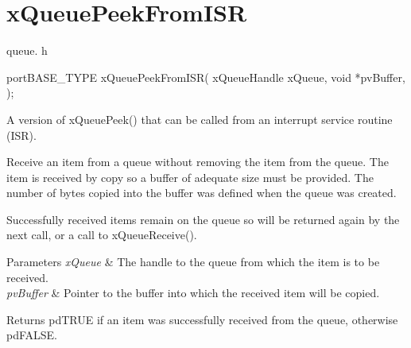 \hypertarget{group__x_queue_peek_from_i_s_r}{\section{x\-Queue\-Peek\-From\-I\-S\-R}
\label{group__x_queue_peek_from_i_s_r}
}
queue. h 
\begin{DoxyPre}
 portBASE\_TYPE xQueuePeekFromISR(
                                                                        xQueueHandle xQueue,
                                                                        void *pvBuffer,
                                                                );\end{DoxyPre}


A version of x\-Queue\-Peek() that can be called from an interrupt service routine (I\-S\-R).

Receive an item from a queue without removing the item from the queue. The item is received by copy so a buffer of adequate size must be provided. The number of bytes copied into the buffer was defined when the queue was created.

Successfully received items remain on the queue so will be returned again by the next call, or a call to x\-Queue\-Receive().


\begin{DoxyParams}{Parameters}
{\em x\-Queue} & The handle to the queue from which the item is to be received.\\
\hline
{\em pv\-Buffer} & Pointer to the buffer into which the received item will be copied.\\
\hline
\end{DoxyParams}
\begin{DoxyReturn}{Returns}
pd\-T\-R\-U\-E if an item was successfully received from the queue, otherwise pd\-F\-A\-L\-S\-E. 
\end{DoxyReturn}
